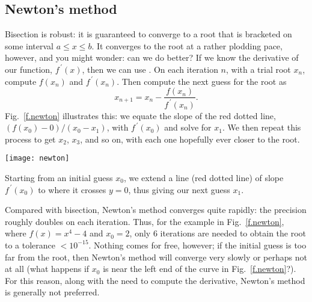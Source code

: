 \subsection{Newton's method}
Bisection is robust: it is guaranteed to converge to a root that is bracketed on some interval $a \le x \le b$. It converges to the root at a rather plodding pace, however, and you might wonder: can we do better? If we know the derivative of our function, $f^{\,\prime}(x)$, then we can use . On each iteration $n$, with a trial root $x_{n}$, compute $f(x_{n})$ and $f^{\,\prime}(x_{n})$. Then compute the next guess for the root as
\[	x_{n+1} = x_{n} - \frac{f(x_{n})}{f^{\,\prime}(x_{n})}. \]
Fig.~\ref{f.newton} illustrates this: we equate the slope of the red dotted line, $(f(x_{0})-0)/(x_{0}-x_{1})$, with $f^{\,\prime}(x_{0})$ and solve for $x_{1}$. We then repeat this process to get $x_{2}$, $x_{3}$, and so on, with each one hopefully ever closer to the root.
\begin{marginfigure}
\texttt{[image: newton]}
\caption[Schematic of Newton's method]{Starting from an initial guess $x_{0}$, we extend a line (red dotted line) of slope $f^{\,\prime}(x_{0})$ to where it crosses $y=0$, thus giving our next guess $x_{1}$.\label{f.newton}}
\end{marginfigure}

Compared with bisection, Newton's method converges quite rapidly: the precision roughly doubles on each iteration. Thus, for the example in Fig.~\ref{f.newton}, where $f(x) = x^{4}-4$ and $x_{0}=2$, only 6 iterations are needed to obtain the root to a tolerance $< 10^{-15}$. Nothing comes for free, however; if the initial guess is too far from the root, then Newton's method will converge very slowly or perhaps not at all (what happens if $x_{0}$ is near the left end of the curve in Fig.~\ref{f.newton}?).
For this reason, along with the need to compute the derivative, Newton's method is generally not preferred.

